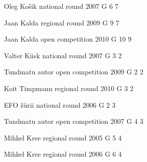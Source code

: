 \documentclass[11pt]{article}
\begin{document}
\ylDisplay{} %
{Oleg Košik} %
{national round} %
{2007} %
{G 6} %
{7} %
{

\ifEngSolution
\fi
}

\ylDisplay{} %
{Jaan Kalda} %
{regional round} %
{2009} %
{G 9} %
{7} %
{

\ifEngSolution
\fi
}

\ylDisplay{} %
{Jaan Kalda} %
{open competition} %
{2010} %
{G 10} %
{9} %
{

\ifEngSolution
\fi
}

\ylDisplay{} %
{Valter Kiisk} %
{national round} %
{2007} %
{G 3} %
{2} %
{

\ifEngSolution
\fi
}

\ylDisplay{} %
{Tundmatu autor} %
{open competition} %
{2009} %
{G 2} %
{2} %
{

\ifEngSolution
\fi
}

\ylDisplay{} %
{Koit Timpmann} %
{regional round} %
{2010} %
{G 3} %
{2} %
{

\ifEngSolution
\fi
}

\ylDisplay{} %
{EFO žürii} %
{national round} %
{2006} %
{G 2} %
{3} %
{

\ifEngSolution
\fi
}

\ylDisplay{} %
{Tundmatu autor} %
{open competition} %
{2007} %
{G 4} %
{3} %
{

\ifEngSolution
\fi
}

\ylDisplay{} %
{Mihkel Kree} %
{regional round} %
{2005} %
{G 5} %
{4} %
{

\ifEngSolution
\fi
}

\ylDisplay{} %
{Mihkel Kree} %
{regional round} %
{2006} %
{G 6} %
{4} %
{

\ifEngSolution
\fi
}
\end{document}
